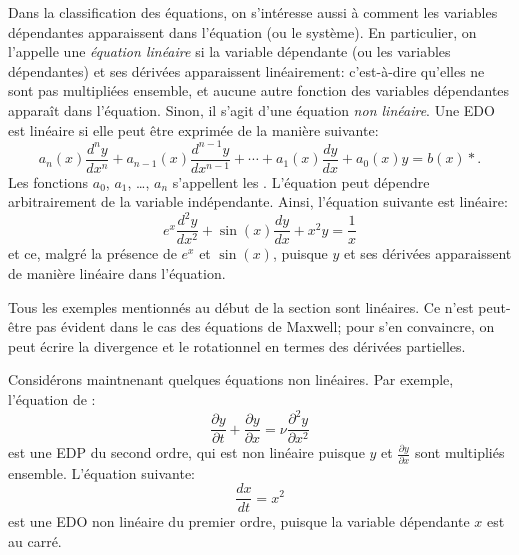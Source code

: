 Dans la classification des équations, on s'intéresse aussi à comment les variables dépendantes apparaissent dans l'équation (ou le système).  En particulier, on l'appelle une 
\emph{équation linéaire} si la variable dépendante (ou les variables dépendantes) et ses dérivées apparaissent linéairement:  c'est-à-dire qu'elles ne sont pas multipliées ensemble, et aucune autre fonction des variables dépendantes appara\^it dans l'équation.  Sinon, il s'agit d'une équation 
\emph{non linéaire}.  Une EDO est linéaire si elle peut être exprimée de la manière suivante: 
\begin{equation} \label{classification:eqlingen}
a_n(x) \frac{d^n y}{dx^n} 
	+ a_{n-1}(x) \frac{d^{n-1} y}{dx^{n-1}} 
	+ \cdots
	+ a_{1}(x) \frac{dy}{dx} 
	+ a_{0}(x) y 
	= b(x) *.
\end{equation}
Les fonctions $a_0$, $a_1$, \ldots, $a_n$ s'appellent les
\emph{}.
L'équation peut dépendre arbitrairement de la variable indépendante.  Ainsi, l'équation suivante est linéaire:
\begin{equation} \label{classification:eqlinex}
	e^x \frac{d^2 y}{dx^2} + \sin(x) \frac{d y}{dx} +  x^2 y = \frac{1}{x}
\end{equation}
et ce, malgré la présence de $e^x$ et $\sin(x)$, puisque $y$ et ses dérivées apparaissent de manière linéaire dans l'équation.

Tous les exemples mentionnés au début de la section sont linéaires.  Ce n'est peut-être pas évident dans le cas des équations de Maxwell; pour s'en convaincre, on peut écrire la divergence et le rotationnel en termes des dérivées partielles. 

Considérons maintnenant quelques équations non linéaires.  Par exemple, l'équation de : 
\begin{equation*}
	\frac{\partial y}{\partial t} +  \frac{\partial y}{\partial x} 
	= \nu \frac{\partial^2 y}{\partial x^2} 
\end{equation*}
est une EDP du second ordre, qui est non linéaire puisque $y$ et $\frac{\partial y}{\partial x}$ sont multipliés ensemble.
L'équation suivante: 
\begin{equation} \label{classification:eqnonlinode}
	\frac{dx}{dt} = x^2
\end{equation}
est une EDO non linéaire du premier ordre, puisque la variable dépendante $x$ est au carré.

\medskip


